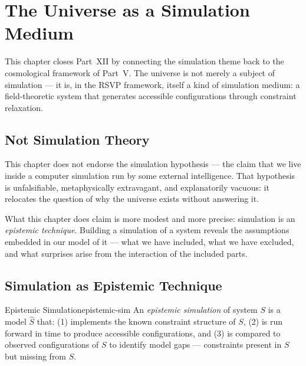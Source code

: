 \chapter{The Universe as a Simulation Medium}



This chapter closes Part~XII by connecting the simulation theme back to
the cosmological framework of Part~V. The universe is not merely a
subject of simulation — it is, in the RSVP framework, itself a kind of
simulation medium: a field-theoretic system that generates accessible
configurations through constraint relaxation.

\section{Not Simulation Theory}

This chapter does not endorse the simulation hypothesis — the claim that
we live inside a computer simulation run by some external intelligence.
That hypothesis is unfalsifiable, metaphysically extravagant, and
explanatorily vacuous: it relocates the question of why the universe
exists without answering it.

What this chapter does claim is more modest and more precise: simulation
is an \emph{epistemic technique}. Building a simulation of a system
reveals the assumptions embedded in our model of it — what we have
included, what we have excluded, and what surprises arise from the
interaction of the included parts.

\section{Simulation as Epistemic Technique}

\begin{definition}{Epistemic Simulation}{epistemic-sim}
  An \emph{epistemic simulation} of system $S$ is a model $\hat{S}$
  that: (1) implements the known constraint structure of $S$,
  (2) is run forward in time to produce accessible configurations,
  and (3) is compared to observed configurations of $S$ to identify
  model gaps — constraints present in $S$ but missing from $\hat{S}$.
\end{definition}

